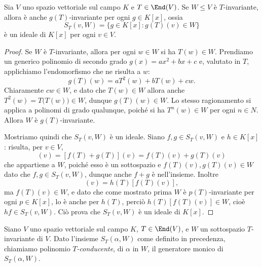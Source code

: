 \begin{lemma}
	Sia $V$ uno spazio vettoriale sul campo $K$ e $T\in\End(V)$.
	Se $W\le V$ è $T$-invariante, allora è anche $g(T)$-invariante per ogni $g\in K[x]$, ossia
	\begin{equation*}
		S_T(v,W)=\{g\in K[x]\colon g(T)(v)\in W\}
	\end{equation*}
	è un ideale di $K[x]$ per ogni $v\in V$.
\end{lemma}
\begin{proof}
	Se $W$ è $T$-invariante, allora per ogni $w\in W$ si ha $T(w)\in W$.
	Prendiamo un generico polinomio di secondo grado $g(x)=ax^2+bx+c$ e, valutato in $T$, applichiamo l'endomorfismo che ne risulta a $w$:
	\begin{equation}
		g(T)(w)=aT^2(w)+bT(w)+cw.
	\end{equation}
	Chiaramente $cw\in W$, e dato che $T(w)\in W$ allora anche $T^2(w)=T\big(T(w)\big)\in W$, dunque $g(T)(w)\in W$.
	Lo stesso ragionamento si applica a polinomi di grado qualunque, poich\'e si ha $T^n(w)\in W$ per ogni $n\in N$.
	Allora $W$ è $g(T)$-invariante.

	Mostriamo quindi che $S_T(v,W)$ è un ideale.
	Siano $f,g\in S_T(v,W)$ e $h\in K[x]$: risulta, per $v\in V$,
	\begin{equation}
		[(f+g)(T)](v)=[f(T)+g(T)](v)=f(T)(v)+g(T)(v)
	\end{equation}
	che appartiene a $W$, poich\'e esso è un sottospazio e $f(T)(v),g(T)(v)\in W$ dato che $f,g\in S_T(v,W)$, dunque anche $f+g$ è nell'insieme.
	Inoltre
	\begin{equation*}
		[(hf)(T)](v)=h(T)[f(T)(v)],
	\end{equation*}
	ma $f(T)(v)\in W$, e dato che come mostrato prima $W$ è $p(T)$-invariante per ogni $p\in K[x]$, lo è anche per $h(T)$, perciò $h(T)[f(T)(v)]\in W$, cioè $hf\in S_T(v,W)$.
	Ciò prova che $S_T(v,W)$ è un ideale di $K[x]$.
\end{proof}

Siano $V$ uno spazio vettoriale sul campo $K$, $T\in\End(V)$, e $W$ un sottospazio $T$-invariante di $V$.
Dato l'insieme $S_T(\alpha,W)$ come definito in precedenza, chiamiamo polinomio \emph{$T$-conducente}, di $\alpha$ in $W$, il generatore monico di $S_T(\alpha,W)$.


